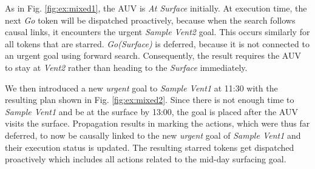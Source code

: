 
As in Fig. \ref{fig:ex:mixed1}, the AUV is {\em At Surface} initially.
At execution time, the next {\em Go} token will be dispatched
proactively, because when the search follows causal links, it
encounters the urgent {\em Sample Vent2} goal.  This occurs similarly
for all tokens that are starred. {\em Go(Surface)} is deferred,
because it is not connected to an urgent goal using forward
search. Consequently, the result requires the AUV to stay at {\em
  Vent2} rather than heading to the {\em Surface} immediately.


We then introduced a new {\em urgent} goal to {\em Sample Vent1} at
11:30 with the resulting plan shown in Fig. \ref{fig:ex:mixed2}. Since
there is not enough time to {\em Sample Vent1} and be at the surface
by 13:00, the goal is placed after the AUV visits the
surface. Propagation results in marking the actions, which were thus
far deferred, to now be causally linked to the new {\em urgent}
goal of {\em Sample Vent1} and their execution status is updated. The
resulting starred tokens get dispatched proactively which includes all
actions related to the mid-day surfacing goal.

